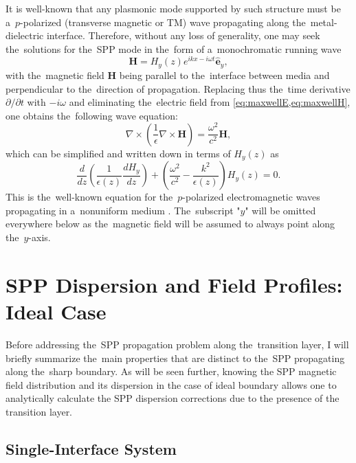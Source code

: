 It is well-known that any plasmonic mode supported by such structure must be a~$p$-polarized (transverse magnetic or TM) wave propagating along the~metal-dielectric interface.
Therefore, without any loss of generality, one may seek the~solutions for the~SPP mode in the~form of a~monochromatic running wave
%
\begin{equation}
\label{eq:runningH}
\mathbf{H} = H_y(z) e^{ikx - i\omega t}\hat{\mathbf{e}}_y,
\end{equation}
%
with the~magnetic field $\mathbf{H}$ being parallel to the~interface between media and perpendicular to the~direction of propagation.
Replacing thus the~time derivative $\partial/\partial t$ with $-i\omega$ and eliminating the~electric field from \cref{eq:maxwellE,eq:maxwellH}, one obtains the~following wave equation:
%
\begin{equation*}
\nabla\times \left( \dfrac{1}{\epsilon} \nabla\times\mathbf{H} \right) = \dfrac{\omega^2}{c^2} \mathbf{H},
\end{equation*}
%
which can be simplified and written down in terms of $H_y(z)$ as
%
\begin{equation}
\label{eq:waveeqPlasmon}
\dfrac{d}{dz}\left(\dfrac{1}{\epsilon(z)}\dfrac{dH_y}{dz}\right) + \left(\dfrac{\omega^2}{c^2}-\dfrac{k^2}{\epsilon(z)}\right)H_y(z) = 0.
\end{equation}
%
This is the~well-known equation for the~$p$-polarized electromagnetic waves propagating in a~nonuniform medium \cite{LLtom8}.
The~subscript "$y$" will be omitted everywhere below as the~magnetic field will be assumed to always point along the~$y$-axis.

\section{SPP Dispersion and Field Profiles: Ideal Case}

Before addressing the~SPP propagation problem along the~transition layer, I will briefly summarize the~main properties that are distinct to the~SPP propagating along the~sharp boundary.
As will be seen further, knowing the SPP magnetic field distribution and its dispersion in the case of ideal boundary allows one to analytically calculate the SPP dispersion corrections due to the presence of the transition layer.


\subsection{Single-Interface System}

